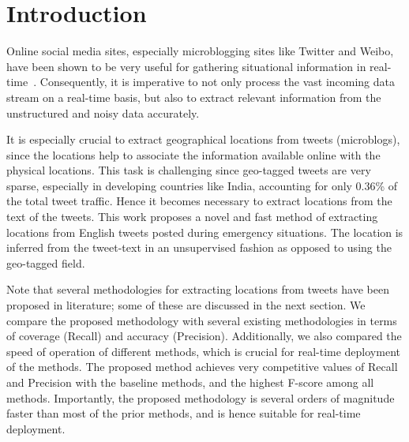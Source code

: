 

\section{Introduction}

Online social media sites, especially microblogging sites like Twitter and Weibo, have been shown to be very useful for gathering  situational information in real-time~\cite{social-media-emergency-survey,rudra-cikm-disaster}. 
Consequently, it is imperative to not only process the vast incoming data stream on a real-time basis, but also to extract relevant information  from the unstructured and noisy data accurately.

It is especially crucial to extract geographical locations from tweets (microblogs), since the locations help to associate the information available online with the physical locations.
This task is challenging since geo-tagged tweets are very sparse, especially in developing countries like
India, accounting for only 0.36\% of the total tweet traffic.
Hence it becomes necessary to extract locations from the text of the tweets.
This work proposes a novel and fast method of extracting locations from English tweets posted during emergency situations. 
The location is inferred from the tweet-text in an unsupervised fashion as opposed to using the geo-tagged field. 

Note that several methodologies for extracting locations from tweets
have been proposed in literature; some of these are discussed in the next section. 
We compare the proposed methodology with several existing methodologies
in terms of coverage (Recall) and accuracy (Precision). 
Additionally, we also compared the speed of operation of different methods, which is crucial for real-time deployment of the methods. 
The proposed method achieves very competitive values of Recall and Precision with the baseline methods, and the highest F-score among all methods.
Importantly, the proposed methodology is several orders of magnitude faster than most of the prior methods, and is hence 
suitable for real-time deployment. 

